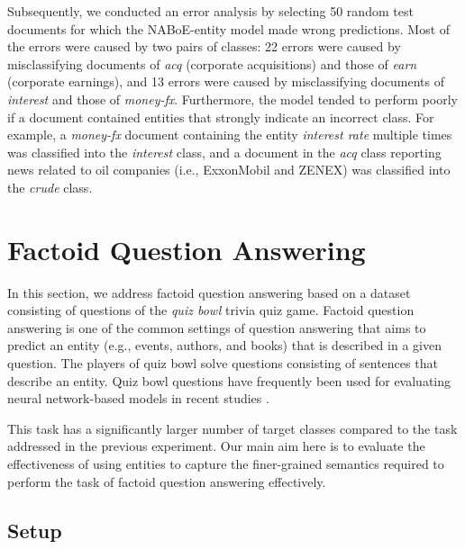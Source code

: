 \documentclass[11pt,a4paper]{article}
\begin{document}
    Subsequently, we conducted an error analysis by selecting 50 random test documents for which the NABoE-entity model made wrong predictions.
    Most of the errors were caused by two pairs of classes:
    22 errors were caused by misclassifying documents of \textit{acq} (corporate acquisitions) and those of \textit{earn} (corporate earnings), and 13 errors were caused by misclassifying documents of \textit{interest} and those of \textit{money-fx}.
    Furthermore, the model tended to perform poorly if a document contained entities that strongly indicate an incorrect class.
    For example, a \textit{money-fx} document containing the entity \textit{interest rate} multiple times was classified into the \textit{interest} class, and a document in the \textit{acq} class reporting news related to oil companies (i.e., ExxonMobil and ZENEX) was classified into the \textit{crude} class.

    \section{Factoid Question Answering}

    In this section, we address factoid question answering based on a dataset consisting of questions of the \textit{quiz bowl} trivia quiz game.
    Factoid question answering is one of the common settings of question answering that aims to predict an entity (e.g., events, authors, and books) that is described in a given question.
    The players of quiz bowl solve questions consisting of sentences that describe an entity.
    Quiz bowl questions have frequently been used for evaluating neural network-based models in recent studies \cite{iyyer-EtAl:2014:EMNLP2014,iyyer-EtAl:2015,TACL1065}.

    This task has a significantly larger number of target classes compared to the task addressed in the previous experiment.
    Our main aim here is to evaluate the effectiveness of using entities to capture the finer-grained semantics required to perform the task of factoid question answering effectively.

    \subsection{Setup}
\end{document}
